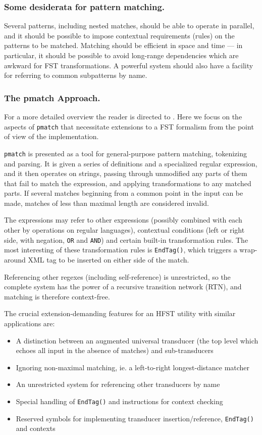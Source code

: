 \documentclass{llncs}
\begin{document}
\subsubsection{Some desiderata for pattern matching.} Several patterns,
including nested matches, should be able to operate in parallel, and
it should be possible to impose contextual requirements (rules) on
the patterns to be matched. Matching should be efficient in space and
time --- in particular, it should be possible to avoid long-range
dependencies which are awkward for FST transformations.
A powerful system should also have a facility for referring
to common subpatterns by name.

\subsubsection{The pmatch Approach.}

For a more detailed overview the reader is directed to \cite{karttunen/2011}.
Here we focus on the aspects of \verb!pmatch! that necessitate extensions
to a FST formalism from the point of view of the implementation.

\verb!pmatch! is presented as a tool for general-purpose pattern matching,
tokenizing and parsing. It is given a series of definitions and a
specialized regular expression, and it then operates on strings, passing
through unmodified any parts of them that fail to match the expression,
and applying transformations to any matched parts. If several matches beginning
from a common point in the input can be made, matches of less than maximal
length are considered invalid.

The expressions may refer to other expressions (possibly combined with each
other by operations on regular languages), contextual conditions
(left or right side, with negation, \verb!OR! and \verb!AND!) and certain
built-in transformation rules. The most interesting of these transformation
rules is \verb!EndTag()!, which triggers a wrap-around XML tag to be inserted
on either side of the match.

Referencing other regexes (including self-reference) is unrestricted, so
the complete system has the power of a recursive transition network (RTN),
and matching is therefore context-free.

The crucial extension-demanding features for an HFST utility
with similar applications are:

\begin{itemize}
\item A distinction between an augmented universal transducer (the top level
  which echoes all input in the absence of matches) and sub-transducers
\item Ignoring non-maximal matching, ie. a left-to-right longest-distance
  matcher
\item An unrestricted system for referencing other transducers by name
\item Special handling of \verb!EndTag()! and instructions for context
  checking
\item Reserved symbols for implementing transducer insertion/reference,
  \verb!EndTag()! and contexts
\end{itemize}
\end{document}

